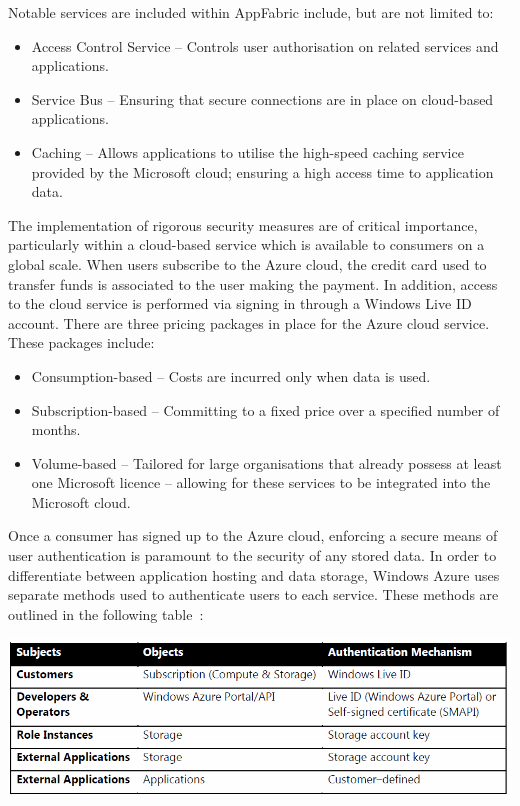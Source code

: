 Notable services are included within AppFabric include, but are not limited to\ftAtwo:\ftAtwoText
\begin{itemize}
\item Access Control Service -- Controls user authorisation on related services and applications.
\item Service Bus -- Ensuring that secure connections are in place on cloud-based applications.
\item Caching -- Allows applications to utilise the high-speed caching service provided by the Microsoft cloud; ensuring a high access time to application data.
\end{itemize}

The implementation of rigorous security measures are of critical importance, particularly within a cloud-based service which is available to consumers on a global scale. When users subscribe to the Azure cloud, the credit card used to transfer funds is associated to the user making the payment. In addition, access to the cloud service is performed via signing in through a Windows Live ID account. 
There are three pricing packages\ftAthree{} in place for the Azure cloud service. These packages include:\ftAthreeText
\begin{itemize}
\item Consumption-based -- Costs are incurred only when data is used.
\item Subscription-based -- Committing to a fixed price over a specified number of months.
\item Volume-based -- Tailored for large organisations that already possess at least one Microsoft licence -- allowing for these services to be integrated into the Microsoft cloud. 
\end{itemize}

Once a consumer has signed up to the Azure cloud, enforcing a secure means of user authentication is paramount to the security of any stored data. In order to differentiate between application hosting and data storage, Windows Azure uses separate methods used to authenticate users to each service. These methods are outlined in the following table~\cite{AzureSecurity}:

\begin{center}
\includegraphics[scale=0.6]{figs/AzureTable.png} \\
\end{center}

